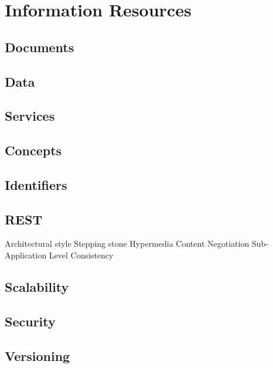 \chapter{Information Resources}

\section{Documents}

\section{Data}

\section{Services}

\section{Concepts}

\section{Identifiers}

\section{REST}
Architectural style
Stepping stone
Hypermedia
Content Negotiation
Sub-Application Level Consistency

\section{Scalability}

\section{Security}

\section{Versioning}